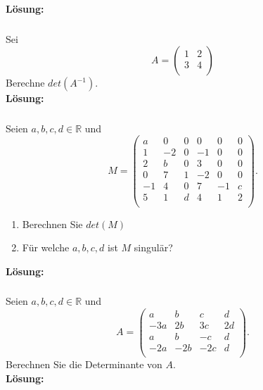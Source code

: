 \noindent \textbf{Lösung:}
\vspace{6cm}

\subsubsection{}
Sei \[
A = \begin{pmatrix}
1 & 2 \\
3 & 4 \\
\end{pmatrix}
\]
Berechne $det(A^{-1})$. \\

\noindent \textbf{Lösung:}

\newpage
\subsubsection{} %
Seien $a, b, c, d \in \mathbb{R}$ und
\[
M = \begin{pmatrix}
a & 0 & 0 & 0 & 0 & 0 \\
1 & -2 & 0 & -1 & 0 & 0 \\
2 & b & 0 & 3 & 0 & 0 \\
0 & 7 & 1 & -2 & 0 & 0 \\
-1 & 4 & 0 & 7 & -1 & c \\
5 & 1 & d & 4 & 1 & 2 \\
\end{pmatrix}.
\]
\begin{enumerate}[label=\alph*)]
    \item Berechnen Sie $det(M)$
    \item Für welche $a, b, c, d$ ist $M$ singulär?
\end{enumerate}

\noindent \textbf{Lösung:}

\newpage
\subsubsection{}%
Seien $a, b, c, d \in \mathbb{R}$ und
\[
A = \begin{pmatrix}
a & b & c & d \\
-3a & 2b & 3c & 2d \\
a & b & -c & d \\
-2a & -2b & -2c & d \\
\end{pmatrix}.
\]
Berechnen Sie die Determinante von $A$. \\

\noindent \textbf{Lösung:}

